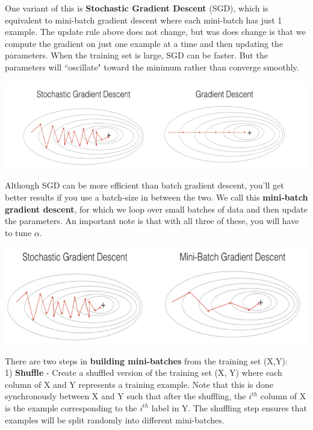 \documentclass[11pt, a4paper]{article}
\begin{document}
\begin{spacing}{1.1}
	\noindent One variant of this is \textbf{Stochastic Gradient Descent} (SGD), which is equivalent to mini-batch gradient descent where each mini-batch has just 1 example. The update rule above does not change, but was does change is that we compute the gradient on just one example at a time and then updating the parameters. When the training set is large, SGD can be faster. But the parameters will ``oscillate" toward the minimum rather than converge smoothly.
	\begin{center}	\includegraphics[scale=.6]{sgd_grad} \\	\end{center}
	Although SGD can be more efficient than batch gradient descent, you'll get better results if you use a batch-size in between the two. We call this \textbf{mini-batch gradient descent}, for which we loop over small batches of data and then update the parameters. An important note is that with all three of these, you will have to tune $\alpha$. 
	\begin{center}	\includegraphics[scale=.6]{mini_grad} \\	\end{center}
	There are two steps in \textbf{building mini-batches} from the training set (X,Y): \vspace*{.7mm} \\
	\hspace*{3mm} 1) \textbf{Shuffle} - Create a shuffled version of the training set (X, Y) where each column of X and Y \hspace*{27mm} represents a training example. Note that this is done synchronously between X and Y \hspace*{27mm} such that after the shuffling, the $i^{th}$ column of X is the example corresponding to the $i^{th}$ \hspace*{27mm} label in Y. The shuffling step ensures that examples will be split randomly into different \hspace*{27mm} mini-batches. \vspace*{1.5mm} \\

\end{spacing}
\end{document}
